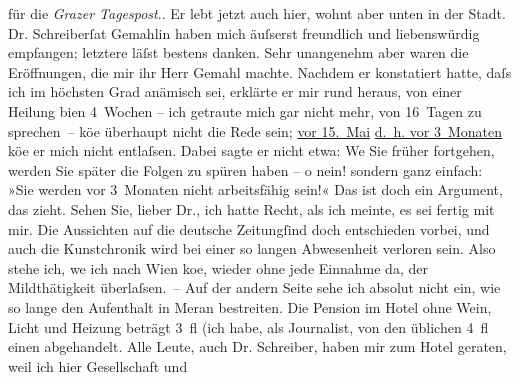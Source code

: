 \begin{ledgroupsized}[t]{13cm}
{{{                        für die \emph{Grazer Tagespost}.}}}\label{K_L00176_2h}. Er lebt
                    jetzt auch hier, wohnt aber unten in der Stadt.\pend
           \pstart
           Dr. Schreiberſa{\geminationm}t Gemahlin haben mich
                    äuſserst freundlich und liebenswürdig empfangen; letztere läſst bestens danken.
                    Sehr unangenehm aber waren die Eröffnungen, die mir ihr Herr Gemahl machte. Nachdem er konstatiert
                    hatte, daſs ich im höchsten Grad anämisch sei, erklärte er mir rund heraus, von
                    einer Heilung bi{\geminationn}en 4 Wochen – ich getraute mich
                    gar nicht mehr, von 16 Tagen zu sprechen – kö{\geminationn}e
                    überhaupt nicht die Rede sein; \uline{vor
                            15. Mai}{ }{\pb}\uline{d. h. vor 3 Monaten} kö{\geminationn}e er mich nicht entlaſsen. Dabei sagte er nicht
                    etwa: We{\geminationn} Sie früher fortgehen, werden Sie später
                    die Folgen zu spüren haben – o nein! sondern ganz einfach: »Sie werden vor
                    3 Monaten nicht arbeitsfähig sein!« Das ist doch ein Argument, das zieht.\pend
           \pstart
           Sehen Sie, lieber Dr., ich hatte Recht, als ich meinte, es sei fertig mit mir.
                    Die Aussichten auf die deutsche Zeitungſind doch entschieden vorbei, und auch die Kunstchronik wird bei einer so langen
                    Abwesenheit verloren sein. Also stehe ich, we{\geminationn} ich
                    nach Wien ko{\geminationm}e,
                    wieder ohne jede Einnahme da, der Mildthätigkeit überlaſsen. – Auf der andern
                    Seite sehe ich absolut nicht ein, wie so lange den Aufenthalt in Meran bestreiten. Die Pension im Hotel ohne
                    Wein, Licht und Heizung beträgt 3 fl (ich habe, als Journalist, von den üblichen
                    4 fl einen abgehandelt. Alle Leute, auch Dr. Schreiber, haben mir zum Hotel geraten, weil ich hier Gesellschaft und

\end{ledgroupsized}
